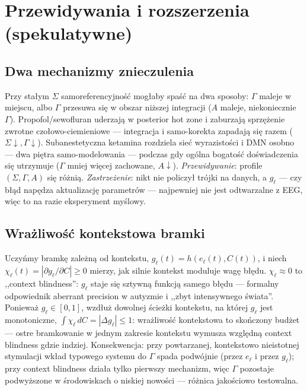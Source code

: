 \documentclass[11pt]{article}
\begin{document}
\section{Przewidywania i rozszerzenia (spekulatywne)}\label{sec:speculative}

\subsection{Dwa mechanizmy znieczulenia}
Przy stałym $\Sigma$ samoreferencyjność mogłaby spaść na dwa sposoby: $\Gamma$ maleje w miejscu, albo $\Gamma$ przesuwa się w obszar niższej integracji ($A$ maleje, niekoniecznie $\Gamma$). Propofol/sewofluran uderzają w posterior hot zone \cite{hotzone2021} i zaburzają sprzężenie zwrotne czołowo-ciemieniowe \cite{lee2013disruption} --- integracja i samo-korekta zapadają się razem ($\Sigma\downarrow,\Gamma\downarrow$). Subanestetyczna ketamina rozdziela sieć wyrazistości i DMN osobno \cite{ketaminemodel2022} --- dwa piętra samo-modelowania --- podczas gdy ogólna bogatość doświadczenia się utrzymuje ($\Gamma$ mniej więcej zachowane, $A\downarrow$). \emph{Przewidywanie}: profile $(\Sigma,\Gamma,A)$ się różnią. \emph{Zastrzeżenie}: nikt nie policzył trójki na danych, a $g_\ell$ --- czy błąd napędza aktualizację parametrów --- najpewniej nie jest odtwarzalne z EEG, więc to na razie eksperyment myślowy.

\subsection{Wrażliwość kontekstowa bramki}
Uczyńmy bramkę zależną od kontekstu, $g_\ell(t)=h(e_\ell(t),C(t))$, i niech $\chi_\ell(t)=|\partial g_\ell/\partial C|\ge0$ mierzy, jak silnie kontekst moduluje wagę błędu. $\chi_\ell\approx0$ to ,,context blindness'': $g_\ell$ staje się sztywną funkcją samego błędu --- formalny odpowiednik aberrant precision w autyzmie \cite{vandecruys2014,qela2025} i ,,zbyt intensywnego świata''. Ponieważ $g_\ell\in[0,1]$, wzdłuż dowolnej ścieżki kontekstu, na której $g_\ell$ jest monotoniczne, $\int\chi_\ell\,dC=|\Delta g_\ell|\le1$: wrażliwość kontekstowa to skończony budżet --- ostre bramkowanie w jednym zakresie kontekstu wymusza względną context blindness gdzie indziej. Konsekwencja: przy powtarzanej, kontekstowo nieistotnej stymulacji wkład typowego systemu do $\Gamma$ spada podwójnie (przez $e_\ell$ i przez $g_\ell$); przy context blindness działa tylko pierwszy mechanizm, więc $\Gamma$ pozostaje podwyższone w środowiskach o niskiej nowości --- różnica jakościowo testowalna.
\end{document}
